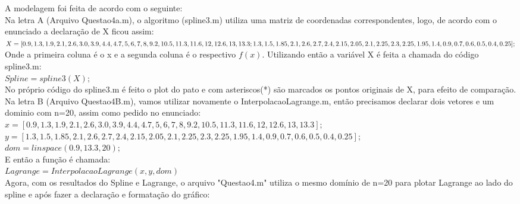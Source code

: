 \documentclass[12pt]{article}
\newenvironment{question}[2][Questão]{\begin{trivlist}
\item[\hskip \labelsep {\bfseries #1}\hskip \labelsep {\bfseries #2.}]}{\end{trivlist}}
\begin{document}
\newpage
\begin{question}{4}
	A modelagem foi feita de acordo com o seguinte:\\
	
	Na letra A (Arquivo Questao4a.m), o algoritmo (spline3.m) utiliza uma matriz de coordenadas correspondentes, logo, de acordo com o enunciado a declaração de X ficou assim:
\\
	
	$X = [0.9, 1.3, 1.9, 2.1, 2.6, 3.0, 3.9, 4.4, 4.7, 5, 6, 7, 8, 9.2, 10.5, 11.3, 11.6, 12, 12.6, 13, 13.3; \\1.3, 1.5, 1.85, 2.1, 2.6, 2.7, 2.4, 2.15, 2.05, 2.1, 2.25, 2.3, 2.25, 1.95, 1.4, 0.9, 0.7, 0.6, 0.5, 0.4, 0.25];
$ \\
	
	Onde a primeira coluna é o x e a segunda coluna é o respectivo $f(x)$. Utilizando então a variável X é feita a chamada do código spline3.m:\\
	
	$Spline = spline3(X);$\\
	
	No próprio código do spline3.m é feito o plot do pato e com asteriscos(*) são marcados os pontos originais de X, para efeito de comparação.\\
	
	Na letra B (Arquivo Questao4B.m), vamos utilizar novamente o InterpolacaoLagrange.m, então precisamos declarar dois vetores e um dominio com n=20, assim como pedido no enunciado:\\
	
	$x = [0.9, 1.3, 1.9, 2.1, 2.6, 3.0, 3.9, 4.4, 4.7, 5, 6, 7, 8, 9.2, 10.5, 11.3, 11.6, 12, 12.6, 13, 13.3];
$\\
	$y = [1.3, 1.5, 1.85, 2.1, 2.6, 2.7, 2.4, 2.15, 2.05, 2.1, 2.25, 2.3, 2.25, 1.95, 1.4, 0.9, 0.7, 0.6, 0.5, 0.4, 0.25];
$\\
	$dom = linspace(0.9,13.3,20);
$\\
	
	E então a função é chamada:
\\
	
	$Lagrange = InterpolacaoLagrange(x,y,dom)
$\\
	
	Agora, com os resultados do Spline e Lagrange, o arquivo "Questao4.m" utiliza o mesmo domínio de n=20 para plotar Lagrange ao lado do spline e após fazer a declaração e formatação do gráfico:\\

	\begin{algorithm}
		\begin{algorithmic}[1]
		\end{algorithmic}
	\end{algorithm}
		
\end{question}
\end{document}
